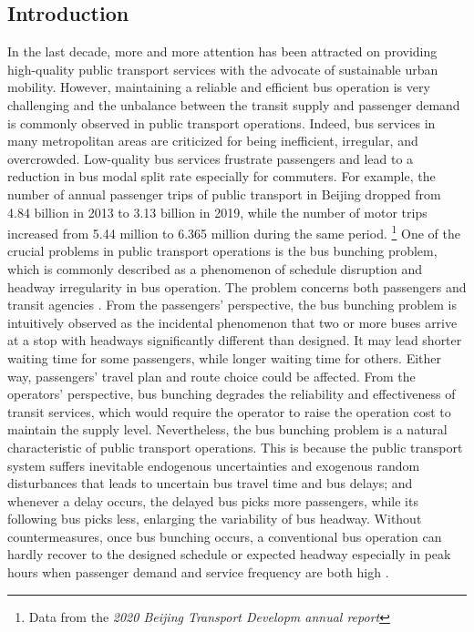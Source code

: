 \documentclass[smallextended]{svjour3}       %
\begin{document}
\begin{Abstract}
\section{Introduction}
\label{intro}
In the last decade, more and more attention has been attracted on providing high-quality public transport services with the advocate of sustainable urban mobility.
However, maintaining a reliable and efficient bus operation is very challenging and the unbalance between the transit supply and passenger demand is commonly observed in public transport operations.
Indeed, bus services in many metropolitan areas are criticized for being inefficient, irregular, and overcrowded.
Low-quality bus services frustrate passengers and lead to a reduction in bus modal split rate especially for commuters.
For example, the number of annual passenger trips of public transport in Beijing dropped from 4.84 billion in 2013 to 3.13 billion in 2019, while the number of motor trips increased from 5.44 million to 6.365 million during the same period.
\footnote[1]{Data from the \textit{2020 Beijing Transport Developm annual report}}
One of the crucial problems in public transport operations is the bus bunching problem, which is commonly described as a phenomenon of schedule disruption and headway irregularity in bus operation.
The problem concerns both passengers and transit agencies \citep{1964Nwell,1972Osuna,2008Hollander,2016Verbich}.
From the passengers' perspective, the bus bunching problem is intuitively observed as the incidental phenomenon that 
two or more buses arrive at a stop with headways significantly different than designed. 
It may lead shorter waiting time for some passengers, while longer waiting time for others. 
Either way, passengers' travel plan and route choice could be affected. 
From the operators' perspective, bus bunching degrades the reliability and effectiveness of transit services, which would require the operator to raise the operation cost to maintain the supply level. 
Nevertheless, the bus bunching problem is a natural characteristic of public transport operations. This is because the public transport system suffers inevitable endogenous uncertainties and exogenous random disturbances that leads to uncertain bus travel time and bus delays; and whenever a delay occurs, the delayed bus picks more passengers, while its following bus picks less, enlarging the variability of bus headway. 
Without countermeasures, once bus bunching occurs, a conventional bus operation can hardly recover to the designed schedule or expected headway especially in peak hours when passenger demand and service frequency are both high \citep{1964Nwell,2001Hickman,2009Daganzo}.


\end{Abstract}
\end{document}
